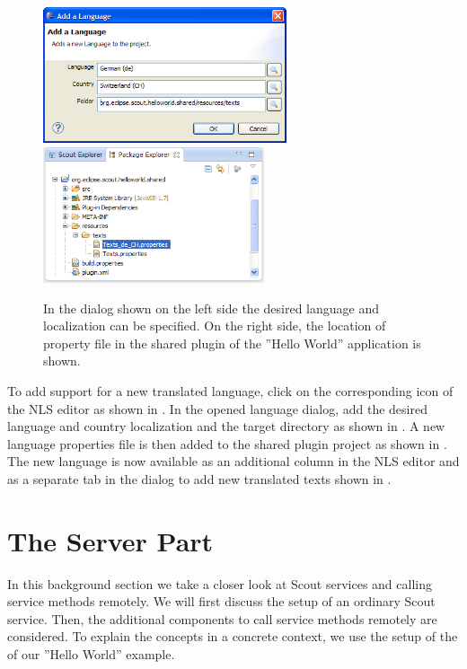 \documentclass[a4paper,10pt,twoside]{book}
\begin{document}
\begin{figure}
\includegraphics[height=4cm]{sdk_add_language_dialog.png} \hspace{0.5cm}
\includegraphics[height=4cm]{sdk_shared_plugin_language_file.png}
\caption{In the dialog  shown on the left side the desired language and localization can be specified.
On the right side, the location of property file  in the shared plugin of the ''Hello World'' application is shown.
}
\end{figure}

To add support for a new translated language, click on the corresponding icon of the NLS editor as shown in .
In the opened language dialog, add the desired language and country localization and the target directory as shown in .
A new language properties file is then added to the shared plugin project as shown in .
The new language is now available as an additional column in the NLS editor and as a separate tab in the dialog to add new translated texts shown in .

\section{The Server Part}

In this background section we take a closer look at Scout services and calling service methods remotely.
We will first discuss the setup of an ordinary Scout service.
Then, the additional components to call service methods remotely are considered.
To explain the concepts in a concrete context, we use the setup of the  of our ''Hello World'' example.
\end{document}
